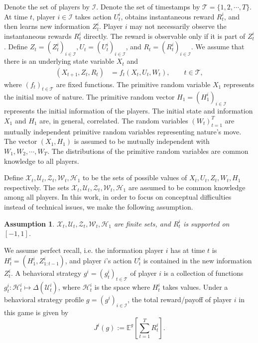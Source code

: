 \documentclass[pdflatex,sn-basic]{sn-jnl}
\newcommand{\E}{\mathbb{E}}
\theoremstyle{thmstyleone}%
\theoremstyle{thmstyletwo}%
\newtheorem{assump}{Assumption}
\theoremstyle{thmstylethree}%
\begin{document}
Denote the set of players by $\mathcal{I}$. Denote the set of timestamps by $\mathcal{T}=\{1,2,\cdots, T\}$. At time $t$, player $i\in\mathcal{I}$ takes action $U_t^i$, obtains instantaneous reward $R_t^i$, and then learns new information $Z_t^i$. Player $i$ may not necessarily observe the instantaneous rewards $R_t^i$ directly. The reward is observable only if it is part of $Z_t^i$. Define $Z_t=(Z_t^i)_{i\in\mathcal{I}}, U_t=(U_t^i)_{i\in\mathcal{I}}$, and $R_t=(R_t^i)_{i\in\mathcal{I}}$. We assume that there is an underlying state variable $X_t$ and
\begin{align}
	(X_{t+1}, Z_t, R_t) &= f_t(X_t, U_t, W_t), \qquad t\in\mathcal{T},
\end{align}
where $(f_t)_{t\in \mathcal{T}}$ are fixed functions. The primitive random variable $X_1$ represents the initial move of nature. The primitive random vector $H_1=(H_1^i)_{i\in\mathcal{I}}$ {represents} the initial information of the players. The initial state and information $X_1$ and $H_1$ are, in general, correlated. The random variables $(W_t)_{t=1}^T$ are mutually independent primitive random variables representing nature's move. The vector $(X_1, H_1)$ is assumed to be mutually independent with $W_1, W_2, \cdots, W_{T}$. The distributions of the primitive random variables are common knowledge to all players.

{Define $\mathcal{X}_t, \mathcal{U}_t, \mathcal{Z}_t, \mathcal{W}_t, \mathcal{H}_1$ to be the sets of possible values of $X_t, U_t, Z_t, W_t, H_1$ respectively. The sets $\mathcal{X}_t, \mathcal{U}_t, \mathcal{Z}_t, \mathcal{W}_t, \mathcal{H}_1$ are assumed to be common knowledge among all players.} In this work, in order to focus on conceptual difficulties instead of technical issues, we make the following assumption. 

\begin{assump}
	$\mathcal{X}_t, \mathcal{U}_t, \mathcal{Z}_t, \mathcal{W}_t, \mathcal{H}_1$ are finite sets, and $R_t^i$ is supported on $[-1, 1]$.
\end{assump}

We assume perfect recall, i.e. the information player $i$ has at time $t$ is $H_t^i = (H_1^i, Z_{1:t-1}^i)$, and player $i$'s action $U_t^i$ is {contained} in the new information $Z_t^i$. 
A behavioral strategy $g^i=(g_t^i)_{t\in\mathcal{T}}$ of player $i$ is a collection of functions $g_t^i\colon \mathcal{H}_t^i\mapsto \Delta(\mathcal{U}_t^i)$, where $\mathcal{H}_t^i$ is the space where $H_t^i$ takes values. Under a behavioral strategy profile $g=(g^i)_{i\in\mathcal{I}}$, the total reward/payoff of player $i$ in this game is given by
\begin{equation}
	J^i(g):=\E^g\left[\sum_{t=1}^{T} R_t^i \right].
\end{equation}
\end{document}
